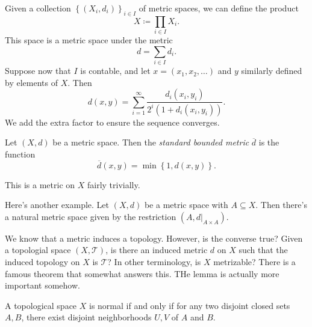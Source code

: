 
Given a collection $\left\{ (X_i,d_i) \right\}_{i\in I} $ of metric spaces, we can define the product
\[
	X\coloneqq \prod_{i\in I} X_i
.\]
This space is a metric space under the metric
\[
	d=\sum_{i\in I} d_i
.\]
Suppose now that $I$ is contable, and let $x=(x_1,x_2, \ldots )$ and $y$ similarly defined by elements of $X$. Then
\[
	d(x,y)=\sum_{i=1}^{\infty} \frac{d_i(x_i,y_i)}{2^i \left( 1+d_i(x_i,y_i) \right) } 
.\]
We add the extra factor to ensure the sequence converges.
\begin{definition}\label{dfn:3.3}
	Let $(X,d)$ be a metric space. Then the \emph{standard bounded metric} $\overline{d} $ is the function
	\[
		\overline{d} (x,y)=\min \left\{ 1,d(x,y) \right\} 
	.\]
\end{definition}
This is a metric on $X$ fairly trivially.

Here's another example. Let $(X,d)$ be a metric space with $A\subseteq X$. Then there's a natural metric space given by the restriction $(A,d|_{A\times A} )$.

We know that a metric induces a topology. However, is the converse true? Given a topologial space $(X,\mathcal{T} )$, is there an induced metric $d$ on $X$ such that the induced topology on $X$ is $\mathcal{T} $? In other terminology, is $X$ metrizable? There is a famous theorem that somewhat answers this. THe lemma is actually more important somehow.
\begin{definition}[Normal]\label{dfn:3.4}
	A topological space $X$ is normal if and only if for any two disjoint closed sets $A,B$, there exist disjoint neighborhoods $U,V$ of $A$ and $B$.
\end{definition}

